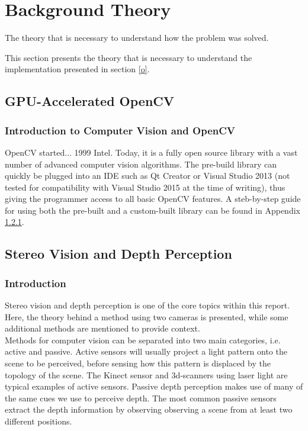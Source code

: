 \section{Background Theory}

The theory that is necessary to understand how the problem was solved.

This section presents the theory that is necessary to understand the implementation presented in section \ref{o}. 

\subsection{GPU-Accelerated OpenCV}

\subsubsection{Introduction to Computer Vision and OpenCV}

OpenCV started... 1999 Intel. Today, it is a fully open source library with a vast number of advanced computer vision algorithms. The pre-build library can quickly be plugged into  an IDE such as Qt Creator or Visual Studio 2013 (not tested for compatibility with Visual Studio 2015 at the time of writing), thus giving the programmer access to all basic OpenCV features. A steb-by-step guide for using both the pre-built and a custom-built library can be found in Appendix \ref{}.

\subsection{Stereo Vision and Depth Perception}

\subsubsection{Introduction}

Stereo vision and depth perception is one of the core topics within this report. Here, the theory behind a method using two cameras is presented, while some additional methods are mentioned to provide context.\\

Methods for computer vision can be separated into two main categories, i.e. active and passive. Active sensors will usually project a light pattern onto the scene to be perceived, before sensing how this pattern is displaced by the topology of the scene. The Kinect sensor and 3d-scanners using laser light are typical examples of active sensors. Passive depth perception makes use of many of the same cues we use to perceive depth. The most common passive sensors extract the depth information by observing observing a scene from at least two different positions. \\

